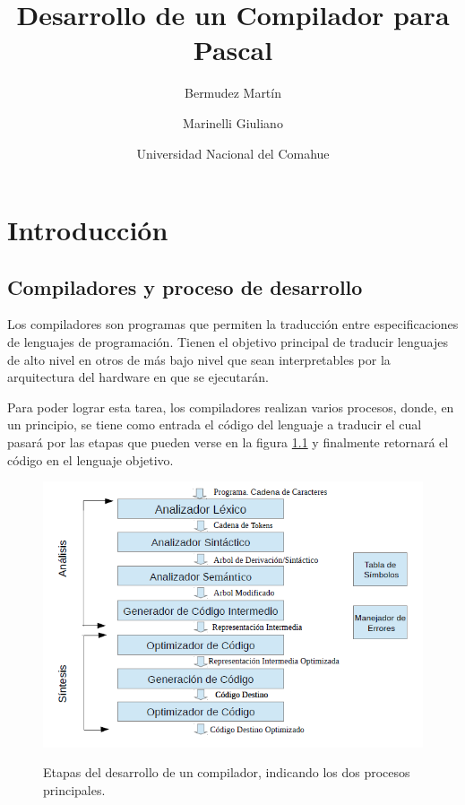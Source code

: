 \documentclass[a4paper]{report}
\begin{document}
\title{Desarrollo de un Compilador para Pascal}
\author{Bermudez Martín \and Marinelli Giuliano}
\date{Universidad Nacional del Comahue}



\tableofcontents
\thispagestyle{empty}


\chapter{Introducción}

\section{Compiladores y proceso de desarrollo}
Los compiladores son programas que permiten la traducción entre especificaciones de lenguajes de programación. Tienen el objetivo principal de traducir lenguajes de alto nivel en otros de más bajo nivel que sean interpretables por la arquitectura del hardware en que se ejecutarán.

Para poder lograr esta tarea, los compiladores realizan varios procesos, donde, en un principio, se tiene como entrada el código del lenguaje a traducir el cual pasará por las etapas que pueden verse en la figura \ref{fig:etapas} y finalmente retornará el código en el lenguaje objetivo.

\begin{figure}[H]
\centering
\resizebox{10cm}{!} {
\includegraphics{img/etapas_compilador.png}
}
\caption{Etapas del desarrollo de un compilador, indicando los dos procesos principales.}
\label{fig:etapas}
\end{figure}
\end{document}
